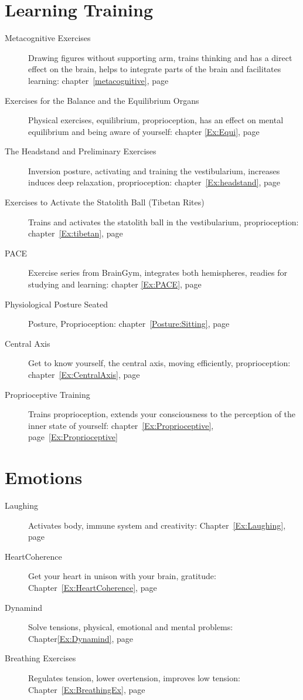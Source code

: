 \documentclass[../main.tex]{subfiles}
\begin{document}
\section{Learning Training}
\begin{description} 
\item[Metacognitive Exercises] Drawing figures without supporting arm, trains thinking and has a direct effect on the brain, helps to integrate parts of the brain and facilitates learning: chapter~\ref{metacognitive}, page~\pageref{metacognitive} %
\item[Exercises for the Balance and the Equilibrium Organs] Physical exercises, equilibrium, proprioception, has an effect on mental equilibrium and being aware of yourself: chapter \ref{Ex:Equi}, page~\pageref{Ex:Equi} %
\item[The Headstand and Preliminary Exercises] Inversion posture, activating and training the vestibularium, increases induces deep relaxation, proprioception: chapter~\ref{Ex:headstand}, page~\pageref{Ex:headstand} %
\item[Exercises to Activate the Statolith Ball (Tibetan Rites)] Trains and activates the statolith ball in the vestibularium, proprioception:
  chapter~\ref{Ex:tibetan}, page~\pageref{Ex:tibetan} %
\item[PACE] Exercise series from BrainGym, integrates both hemispheres, readies for studying and learning: chapter \ref{Ex:PACE}, page \pageref{Ex:PACE} %
\item[Physiological Posture Seated] Posture, Proprioception: chapter~\ref{Posture:Sitting}, page~\pageref{Posture:Sitting} %
\item[Central Axis] Get to know yourself, the central axis, moving efficiently, proprioception: chapter~\ref{Ex:CentralAxis}, page~\pageref{Ex:CentralAxis}
\item[Proprioceptive Training] Trains proprioception, extends your consciousness to the perception of the inner state of yourself: chapter~\ref{Ex:Proprioceptive}, page~\ref{Ex:Proprioceptive} %
\end{description}

\section{Emotions}
\begin{description}
  \item[Laughing] Activates body, immune system and creativity: Chapter~\ref{Ex:Laughing}, page ~\pageref{Ex:Laughing} %
\item[HeartCoherence] Get your heart in unison with your brain, gratitude: Chapter~\ref{Ex:HeartCoherence}, page~\pageref{Ex:HeartCoherence} %
\item[Dynamind] Solve tensions, physical, emotional and mental problems: Chapter\ref{Ex:Dynamind}, page ~\pageref{Ex:Dynamind} %
  \item[Breathing Exercises] Regulates tension, lower overtension, improves low tension: Chapter~\ref{Ex:BreathingEx}, page~\pageref{Ex:BreathingEx}
\end{description}
\end{document}
